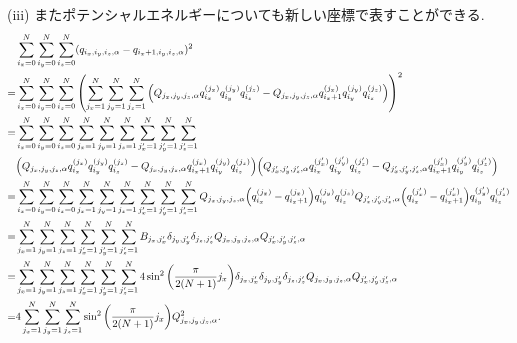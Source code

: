 \documentclass[uplatex,dvipdfmx,a4paper,11pt]{jlreq}
\theoremstyle{definition}
\begin{document}
(iii) またポテンシャルエネルギーについても新しい座標で表すことができる.
\begin{align}
    & \sum_{i_x=0}^{N}\sum_{i_y=0}^{N}\sum_{i_z=0}^{N}(q_{i_x,i_y,i_z,\alpha} - q_{i_x+1,i_y,i_z,\alpha})^2                                                                                                                                                                                                                                                \\
  = & \sum_{i_x=0}^{N}\sum_{i_y=0}^{N}\sum_{i_z=0}^{N}\qty(\sum_{j_x=1}^{N}\sum_{j_y=1}^{N}\sum_{j_z=1}^{N}\qty(Q_{j_x,j_y,j_z,\alpha}q_{i_x}^{(j_x)}q_{i_y}^{(j_y)}q_{i_z}^{(j_z)} - Q_{j_x,j_y,j_z,\alpha}q_{i_x+1}^{(j_x)}q_{i_y}^{(j_y)}q_{i_z}^{(j_z)}))^2                                                                                            \\
  = & \sum_{i_x=0}^{N}\sum_{i_y=0}^{N}\sum_{i_z=0}^{N}\sum_{j_x=1}^{N}\sum_{j_y=1}^{N}\sum_{j_z=1}^{N}\sum_{j_x'=1}^{N}\sum_{j_y'=1}^{N}\sum_{j_z'=1}^{N}                                                                                                                                                                                                  \\
    & \qty(Q_{j_x,j_y,j_z,\alpha}q_{i_x}^{(j_x)}q_{i_y}^{(j_y)}q_{i_z}^{(j_z)} - Q_{j_x,j_y,j_z,\alpha}q_{i_x+1}^{(j_x)}q_{i_y}^{(j_y)}q_{i_z}^{(j_z)})\qty(Q_{j_x',j_y',j_z',\alpha}q_{i_x}^{(j_x')}q_{i_y}^{(j_y')}q_{i_z}^{(j_z')} - Q_{j_x',j_y',j_z',\alpha}q_{i_x+1}^{(j_x')}q_{i_y}^{(j_y')}q_{i_z}^{(j_z')})                                       \\
  = & \sum_{i_x=0}^{N}\sum_{i_y=0}^{N}\sum_{i_z=0}^{N}\sum_{j_x=1}^{N}\sum_{j_y=1}^{N}\sum_{j_z=1}^{N}\sum_{j_x'=1}^{N}\sum_{j_y'=1}^{N}\sum_{j_z'=1}^{N}Q_{j_x,j_y,j_z,\alpha}\qty(q_{i_x}^{(j_x)} - q_{i_x+1}^{(j_x)})q_{i_y}^{(j_y)}q_{i_z}^{(j_z)}Q_{j_x',j_y',j_z',\alpha}\qty(q_{i_x}^{(j_x')} - q_{i_x+1}^{(j_x')})q_{i_y}^{(j_y')}q_{i_z}^{(j_z')} \\
  = & \sum_{j_x=1}^{N}\sum_{j_y=1}^{N}\sum_{j_z=1}^{N}\sum_{j_x'=1}^{N}\sum_{j_y'=1}^{N}\sum_{j_z'=1}^{N}B_{j_x,j_x'}\delta_{j_y,j_y'}\delta_{j_z,j_z'}Q_{j_x,j_y,j_z,\alpha}Q_{j_x',j_y',j_z',\alpha}                                                                                                                                                     \\
  = & \sum_{j_x=1}^{N}\sum_{j_y=1}^{N}\sum_{j_z=1}^{N}\sum_{j_x'=1}^{N}\sum_{j_y'=1}^{N}\sum_{j_z'=1}^{N}4\sin^2\qty(\frac{\pi}{2(N+1)}j_x)\delta_{j_x,j_x'}\delta_{j_y,j_y'}\delta_{j_z,j_z'}Q_{j_x,j_y,j_z,\alpha}Q_{j_x',j_y',j_z',\alpha}                                                                                                              \\
  = & 4\sum_{j_x=1}^{N}\sum_{j_y=1}^{N}\sum_{j_z=1}^{N}\sin^2\qty(\frac{\pi}{2(N+1)}j_x)Q_{j_x,j_y,j_z,\alpha}^2.
\end{align}
\end{document}
